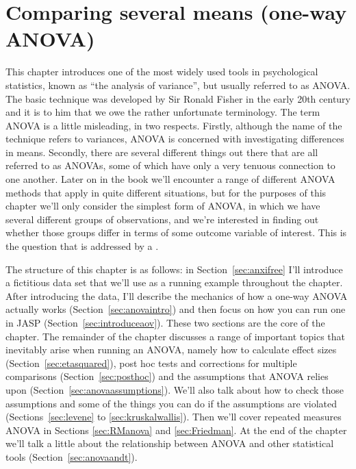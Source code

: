 

\chapter{Comparing several means (one-way ANOVA)\label{ch:anova}}

This chapter introduces one of the most widely used tools in psychological statistics, known as ``the analysis of variance'', but usually referred to as ANOVA. The basic technique was developed by Sir Ronald Fisher in the early 20th century and it is to him that we owe the rather unfortunate terminology. The term ANOVA is a little misleading, in two respects. Firstly, although the name of the technique refers to variances, ANOVA is concerned with investigating differences in means. Secondly, there are several different things out there that are all referred to as ANOVAs, some of which have only a very tenuous connection to one another. Later on in the book we'll encounter a range of different ANOVA methods that apply in quite different situations, but for the purposes of this chapter we'll only consider the simplest form of ANOVA, in which we have several different groups of observations, and we're interested in finding out whether those groups differ in terms of some outcome variable of interest. This is the question that is addressed by a . 

The structure of this chapter is as follows: in Section~\ref{sec:anxifree} I'll introduce a fictitious data set that we'll use as a running example throughout the chapter. After introducing the data, I'll describe the mechanics of how a one-way ANOVA actually works (Section~\ref{sec:anovaintro}) and then focus on how you can run one in JASP (Section~\ref{sec:introduceaov}). These two sections are the core of the chapter. The remainder of the chapter discusses a range of important topics that inevitably arise when running an ANOVA, namely how to calculate effect sizes (Section~\ref{sec:etasquared}), post hoc tests and corrections for multiple comparisons (Section~\ref{sec:posthoc}) and the assumptions that ANOVA relies upon (Section~\ref{sec:anovaassumptions}). We'll also talk about how to check those assumptions and some of the things you can do if the assumptions are violated (Sections~\ref{sec:levene} to \ref{sec:kruskalwallis}). Then we'll cover repeated measures ANOVA in Sections \ref{sec:RManova} and \ref{sec:Friedman}. At the end of the chapter we'll talk a little about the relationship between ANOVA and other statistical tools (Section~\ref{sec:anovaandt}). 


